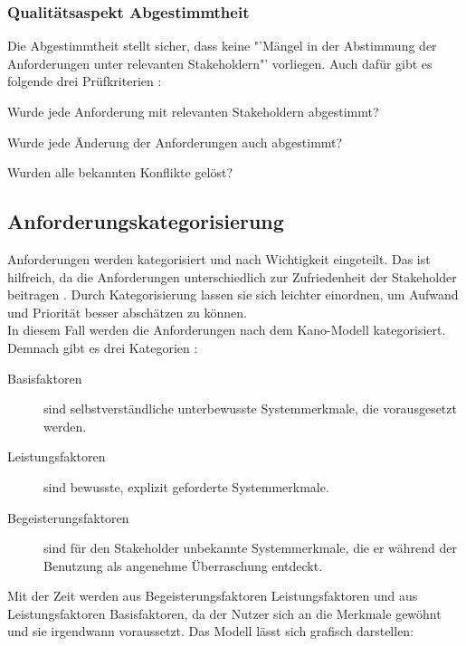 \documentclass [12pt, a4paper, oneside, titlepage, ngerman]{article}
\begin{document}
\subsubsection{Qualitätsaspekt Abgestimmtheit}
Die Abgestimmtheit stellt sicher, dass keine "'Mängel in der Abstimmung der Anforderungen unter relevanten Stakeholdern"'\cite[S.100]{PohlRupp2015} vorliegen. Auch dafür gibt es folgende drei Prüfkriterien\cite[vgl.][S.100]{PohlRupp2015} :
\begin{description}[font=\itshape]\setlength\itemsep{0em}
\item[Abstimmung:] Wurde jede Anforderung mit relevanten Stakeholdern abgestimmt?
\item[Abstimmung nach Änderungen:] Wurde jede Änderung der Anforderungen auch abgestimmt?
\item[Konflikte:] Wurden alle bekannten Konflikte gelöst?
\end{description}

\subsection{Anforderungskategorisierung}
Anforderungen werden kategorisiert und nach Wichtigkeit eingeteilt. Das ist hilfreich, da die Anforderungen unterschiedlich zur Zufriedenheit der Stakeholder beitragen \cite[vgl.][S.24]{PohlRupp2015}. Durch Kategorisierung lassen sie sich leichter einordnen, um Aufwand und Priorität besser abschätzen zu können. \\
In diesem Fall werden die Anforderungen nach dem Kano-Modell kategorisiert. Demnach gibt es drei Kategorien \cite[vgl. S.24]{PohlRupp2015}:
\begin{description} 
\item[Basisfaktoren] sind selbstverständliche unterbewusste Systemmerkmale, die vorausgesetzt werden. 
\item[Leistungsfaktoren] sind bewusste, explizit geforderte Systemmerkmale.
\item[Begeisterungsfaktoren] sind für den Stakeholder unbekannte Systemmerkmale, die er während der Benutzung als angenehme Überraschung entdeckt.
\end{description}
Mit der Zeit werden aus Begeisterungsfaktoren Leistungsfaktoren und aus Leistungsfaktoren Basisfaktoren, da der Nutzer sich an die Merkmale gewöhnt und sie irgendwann voraussetzt. Das Modell lässt sich grafisch darstellen: 
\end{document}
